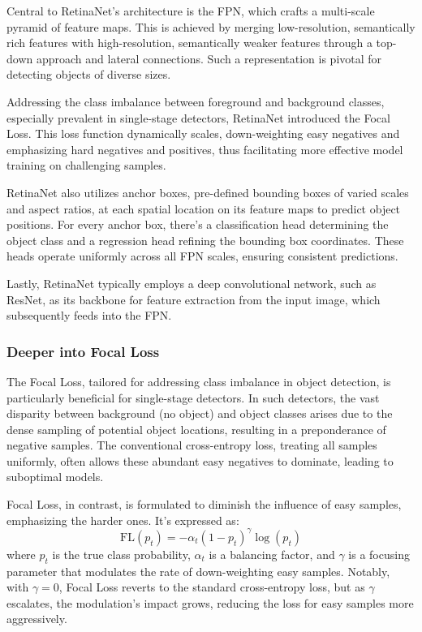 \documentclass{article}
\begin{document}
Central to RetinaNet's architecture is the FPN, which crafts a multi-scale pyramid of feature maps. This is achieved by merging low-resolution, semantically rich features with high-resolution, semantically weaker features through a top-down approach and lateral connections. Such a representation is pivotal for detecting objects of diverse sizes.

Addressing the class imbalance between foreground and background classes, especially prevalent in single-stage detectors, RetinaNet introduced the Focal Loss. This loss function dynamically scales, down-weighting easy negatives and emphasizing hard negatives and positives, thus facilitating more effective model training on challenging samples.

RetinaNet also utilizes anchor boxes, pre-defined bounding boxes of varied scales and aspect ratios, at each spatial location on its feature maps to predict object positions. For every anchor box, there's a classification head determining the object class and a regression head refining the bounding box coordinates. These heads operate uniformly across all FPN scales, ensuring consistent predictions.

Lastly, RetinaNet typically employs a deep convolutional network, such as ResNet, as its backbone for feature extraction from the input image, which subsequently feeds into the FPN.

\subsubsection{Deeper into Focal Loss}

The Focal Loss, tailored for addressing class imbalance in object detection, is particularly beneficial for single-stage detectors. In such detectors, the vast disparity between background (no object) and object classes arises due to the dense sampling of potential object locations, resulting in a preponderance of negative samples. The conventional cross-entropy loss, treating all samples uniformly, often allows these abundant easy negatives to dominate, leading to suboptimal models.

Focal Loss, in contrast, is formulated to diminish the influence of easy samples, emphasizing the harder ones. It's expressed as:
\[ \text{FL}(p_t) = -\alpha_t (1 - p_t)^\gamma \log(p_t) \]
where \( p_t \) is the true class probability, \( \alpha_t \) is a balancing factor, and \( \gamma \) is a focusing parameter that modulates the rate of down-weighting easy samples. Notably, with \( \gamma = 0 \), Focal Loss reverts to the standard cross-entropy loss, but as \( \gamma \) escalates, the modulation's impact grows, reducing the loss for easy samples more aggressively.
\end{document}
